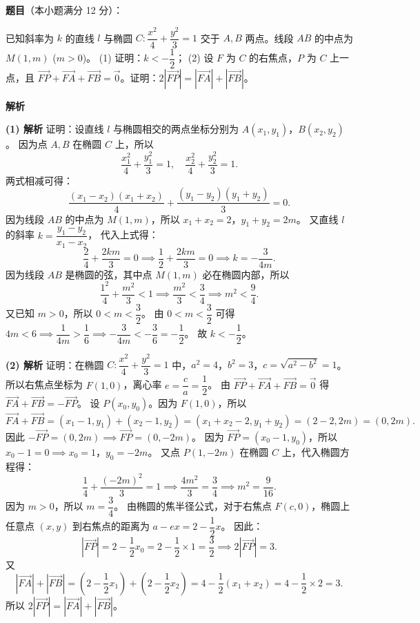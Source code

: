 \begin{answer}

\textbf{题目}（本小题满分 12 分）：

已知斜率为 $k$ 的直线 $l$ 与椭圆 $C: \dfrac{x^2}{4} + \dfrac{y^2}{3} = 1$ 交于 $A, B$ 两点。线段 $AB$ 的中点为 $M(1, m)$ ($m > 0$)。
(1) 证明：$k < -\dfrac12$；
(2) 设 $F$ 为 $C$ 的右焦点，$P$ 为 $C$ 上一点，且 $\vec{FP} + \vec{FA} + \vec{FB} = \vec{0}$。证明：$2|\vec{FP}| = |\vec{FA}| + |\vec{FB}|$。

\textbf{解析}

\textbf{(1) 解析} 证明：设直线 $l$ 与椭圆相交的两点坐标分别为 $A(x_1, y_1)$，$B(x_2, y_2)$。
因为点 $A, B$ 在椭圆 $C$ 上，所以
\nopagebreak[4]
\[\dfrac{x_1^2}{4} + \dfrac{y_1^2}{3} = 1, \quad \dfrac{x_2^2}{4} + \dfrac{y_2^2}{3} = 1.\]
两式相减可得：
\nopagebreak[4]
\[\dfrac{(x_1 - x_2)(x_1 + x_2)}{4} + \dfrac{(y_1 - y_2)(y_1 + y_2)}{3} = 0.\]
因为线段 $AB$ 的中点为 $M(1, m)$，所以 $x_1 + x_2 = 2$，$y_1 + y_2 = 2m$。
又直线 $l$ 的斜率 $k = \dfrac{y_1 - y_2}{x_1 - x_2}$，
代入上式得：
\nopagebreak[4]
\[\dfrac{2}{4} + \dfrac{2km}{3} = 0 \implies \dfrac12 + \dfrac{2km}{3} = 0 \implies k = -\dfrac{3}{4m}.\]
因为线段 $AB$ 是椭圆的弦，其中点 $M(1, m)$ 必在椭圆内部，所以
\nopagebreak[4]
\[\dfrac{1^2}{4} + \dfrac{m^2}{3} < 1 \implies \dfrac{m^2}{3} < \dfrac34 \implies m^2 < \dfrac94.\]
又已知 $m > 0$，所以 $0 < m < \dfrac32$。
由 $0 < m < \dfrac32$ 可得 $4m < 6 \implies \dfrac{1}{4m} > \dfrac16 \implies -\dfrac{3}{4m} < -\dfrac{3}{6} = -\dfrac12$。
故 $k < -\dfrac12$。

\textbf{(2) 解析} 证明：在椭圆 $C: \dfrac{x^2}{4} + \dfrac{y^2}{3} = 1$ 中，$a^2 = 4$，$b^2 = 3$，$c = \sqrt{a^2 - b^2} = 1$。
所以右焦点坐标为 $F(1, 0)$，离心率 $e = \dfrac{c}{a} = \dfrac12$。
由 $\vec{FP} + \vec{FA} + \vec{FB} = \vec{0}$ 得 $\vec{FA} + \vec{FB} = -\vec{FP}$。
设 $P(x_0, y_0)$。因为 $F(1, 0)$，所以
\nopagebreak[4]
\[\vec{FA} + \vec{FB} = (x_1 - 1, y_1) + (x_2 - 1, y_2) = (x_1 + x_2 - 2, y_1 + y_2) = (2 - 2, 2m) = (0, 2m).\]
因此 $-\vec{FP} = (0, 2m) \implies \vec{FP} = (0, -2m)$。
因为 $\vec{FP} = (x_0 - 1, y_0)$，所以 $x_0 - 1 = 0 \implies x_0 = 1$，$y_0 = -2m$。
又点 $P(1, -2m)$ 在椭圆 $C$ 上，代入椭圆方程得：
\nopagebreak[4]
\[\dfrac{1}{4} + \dfrac{(-2m)^2}{3} = 1 \implies \dfrac{4m^2}{3} = \dfrac34 \implies m^2 = \dfrac{9}{16}.\]
因为 $m > 0$，所以 $m = \dfrac34$。
由椭圆的焦半径公式，对于右焦点 $F(c, 0)$，椭圆上任意点 $(x, y)$ 到右焦点的距离为 $a - ex = 2 - \dfrac12 x$。
因此：
\nopagebreak[4]
\[|\vec{FP}| = 2 - \dfrac12 x_0 = 2 - \dfrac12\times 1 = \dfrac32 \implies 2|\vec{FP}| = 3.\]
又
\nopagebreak[4]
\[|\vec{FA}| + |\vec{FB}| = \left(2 - \dfrac12 x_1\right) + \left(2 - \dfrac12 x_2\right) = 4 - \dfrac12(x_1 + x_2) = 4 - \dfrac12\times 2 = 3.\]
所以 $2|\vec{FP}| = |\vec{FA}| + |\vec{FB}|$。



\end{answer}
